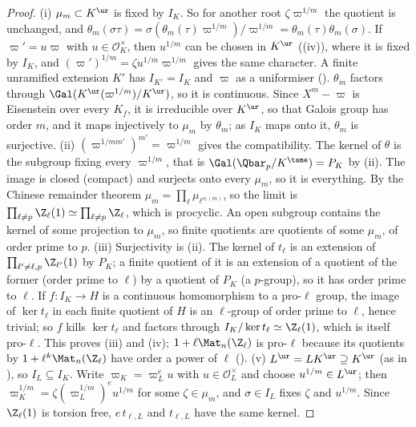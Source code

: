 \begin{proof}
(i) $\mu_m\subset K^{\ur}$ is fixed by $I_K$. So for another root $\zeta\varpi^{1/m}$ the quotient is unchanged, and
$\theta_m(\sigma\tau)=\sigma(\theta_m(\tau)\varpi^{1/m})/\varpi^{1/m}=\theta_m(\tau)\theta_m(\sigma)$. If $\varpi'=u\varpi$ with $u\in\mathcal O_K^\times$, then $u^{1/m}$ can be chosen
in $K^{\ur}$ ((iv)), where it is fixed by $I_K$, and $(\varpi')^{1/m}=\zeta u^{1/m}\varpi^{1/m}$ gives the same character. A finite
unramified extension $K'$ has $I_{K'}=I_K$ and $\varpi$ as a uniformiser (). $\theta_m$ factors through
$\Gal(K^{\ur}(\varpi^{1/m})/K^{\ur})$, so it is continuous. Since $X^m-\varpi$ is Eisenstein over every $K_f$, it is irreducible over $K^{\ur}$, so that Galois
group has order $m$, and it maps injectively to $\mu_m$ by $\theta_m$; as $I_K$ maps onto it, $\theta_m$ is surjective.
(ii) $(\varpi^{1/mm'})^{m'}=\varpi^{1/m}$ gives the compatibility. The kernel of $\theta$ is the subgroup fixing every $\varpi^{1/m}$, that is
$\Gal(\Qbar_p/K^{\tame})=P_K$ by (ii). The image is closed (compact) and surjects onto every $\mu_m$, so it is
everything. By the Chinese remainder theorem $\mu_m=\prod_{\ell}\mu_{\ell^{v_\ell(m)}}$, so the limit is $\prod_{\ell\ne p}\Z_\ell(1)\simeq\prod_{\ell\ne p}\Z_\ell$, which is
procyclic. An open subgroup contains the kernel of some projection to $\mu_m$, so finite quotients are quotients of some $\mu_m$, of order prime to
$p$.
(iii) Surjectivity is (ii). The kernel of $t_\ell$ is an extension of $\prod_{\ell'\ne\ell,p}\Z_{\ell'}(1)$ by $P_K$; a finite quotient of it is an extension of a
quotient of the former (order prime to $\ell$) by a quotient of $P_K$ (a $p$-group), so it has order prime to $\ell$. If $f\colon I_K\to H$ is a continuous
homomorphism to a pro-$\ell$ group, the image of $\ker t_\ell$ in each finite quotient of $H$ is an $\ell$-group of order prime to $\ell$, hence trivial;
so $f$ kills $\ker t_\ell$ and factors through $I_K/\ker t_\ell\simeq\Z_\ell(1)$, which is itself pro-$\ell$. This proves (iii) and (iv);
$1+\ell\Mat_n(\Z_\ell)$ is pro-$\ell$ because its quotients by $1+\ell^k\Mat_n(\Z_\ell)$ have order a power of $\ell$ ().
(v) $L^{\ur}=LK^{\ur}\supseteq K^{\ur}$ (as in ), so $I_L\subseteq I_K$. Write $\varpi_K=\varpi_L^eu$ with $u\in\mathcal O_L^\times$ and choose
$u^{1/m}\in L^{\ur}$; then $\varpi_K^{1/m}=\zeta(\varpi_L^{1/m})^eu^{1/m}$ for some $\zeta\in\mu_m$, and $\sigma\in I_L$ fixes $\zeta$ and $u^{1/m}$. Since $\Z_\ell(1)$ is
torsion free, $e\,t_{\ell,L}$ and $t_{\ell,L}$ have the same kernel.
\end{proof}

